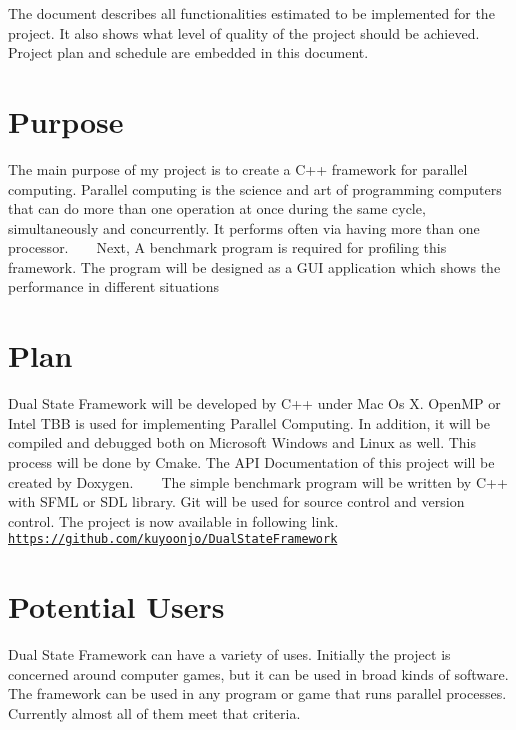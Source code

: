 The document describes all functionalities estimated to be implemented for the project. It also shows what level of quality of the project should be achieved. Project plan and schedule are embedded in this document. \hypertarget{_introduction_IntroductionPurpose}{}\section{Purpose}\label{_introduction_IntroductionPurpose}
The main purpose of my project is to create a C++ framework for parallel computing. Parallel computing is the science and art of programming computers that can do more than one operation at once during the same cycle, simultaneously and concurrently. It performs often via having more than one processor. ~\newline
~\newline
Next, A benchmark program is required for profiling this framework. The program will be designed as a G\+U\+I application which shows the performance in different situations \hypertarget{_introduction_IntroductionPlan}{}\section{Plan}\label{_introduction_IntroductionPlan}
Dual State Framework will be developed by C++ under Mac Os X. Open\+M\+P or Intel T\+B\+B is used for implementing Parallel Computing. In addition, it will be compiled and debugged both on Microsoft Windows and Linux as well. This process will be done by Cmake. The A\+P\+I Documentation of this project will be created by Doxygen. ~\newline
~\newline
The simple benchmark program will be written by C++ with S\+F\+M\+L or S\+D\+L library. Git will be used for source control and version control. The project is now available in following link. ~\newline
~\newline
\href{https://github.com/kuyoonjo/DualStateFramework}{\tt https\+://github.\+com/kuyoonjo/\+Dual\+State\+Framework} \hypertarget{_introduction_IntroductionPotentialUsers}{}\section{Potential Users}\label{_introduction_IntroductionPotentialUsers}
Dual State Framework can have a variety of uses. Initially the project is concerned around computer games, but it can be used in broad kinds of software. The framework can be used in any program or game that runs parallel processes. Currently almost all of them meet that criteria. 